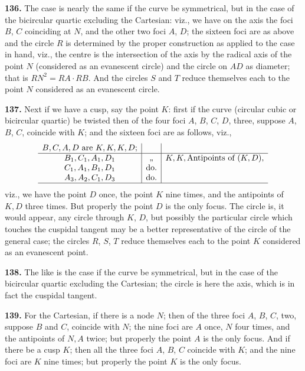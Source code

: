 \documentclass[12pt,a4paper]{article}
\theoremstyle{definition}
\begin{document}
\noindent\textbf{136.} The case is nearly the same if the curve be symmetrical, but in the case
of the bicircular quartic excluding the Cartesian: viz., we have on the axis the foci
$B$, $C$ coinciding at $N$, and the other two foci $A$, $D$; the sixteen foci are as above
and the circle $R$ is determined by the proper construction as applied to the case in
hand, viz., the centre is the intersection of the axis by the radical axis of the
point $N$ (considered as an evanescent circle) and the circle on $AD$ as diameter; that
is $RN^2 = RA \cdot RB$. And the circles $S$ and $T$ reduce themselves each to the point $N$
considered as an evanescent circle.

\noindent\textbf{137.} Next if we have a cusp, say the point $K$: first if the curve (circular cubic
or bicircular quartic) be twisted then of the four foci $A$, $B$, $C$, $D$, three, suppose
$A$, $B$, $C$, coincide with $K$; and the sixteen foci are as follows, viz.,
\[
\begin{array}{c|c|c}
B, C, A, D \text{ are } K, K, K, D; & & \\
\hline
B_1, C_1, A_1, D_1 & \text{,,} & K, K, \text{Antipoints of }(K, D), \\
C_1, A_1, B_1, D_1 & \text{do.} & \\
A_3, A_2, C_1, D_3 & \text{do.} & \\
\hline
\end{array}
\]
viz., we have the point $D$ once, the point $K$ nine times, and the antipoints of $K, D$
three times. But properly the point $D$ is the only focus. The circle is, it would
appear, any circle through $K$, $D$, but possibly the particular circle which touches the
cuspidal tangent may be a better representative of the circle of the general case;
the circles $R$, $S$, $T$ reduce themselves each to the point $K$ considered as an evanescent
point.

\noindent\textbf{138.} The like is the case if the curve be symmetrical, but in the case of the
bicircular quartic excluding the Cartesian; the circle is here the axis, which is in
fact the cuspidal tangent.

\noindent\textbf{139.} For the Cartesian, if there is a node $N$; then of the three foci $A$, $B$, $C$,
two, suppose $B$ and $C$, coincide with $N$; the nine foci are $A$ once, $N$ four times, and
the antipoints of $N, A$ twice; but properly the point $A$ is the only focus. And if
there be a cusp $K$; then all the three foci $A$, $B$, $C$ coincide with $K$; and the nine
foci are $K$ nine times; but properly the point $K$ is the only focus.
\end{document}
